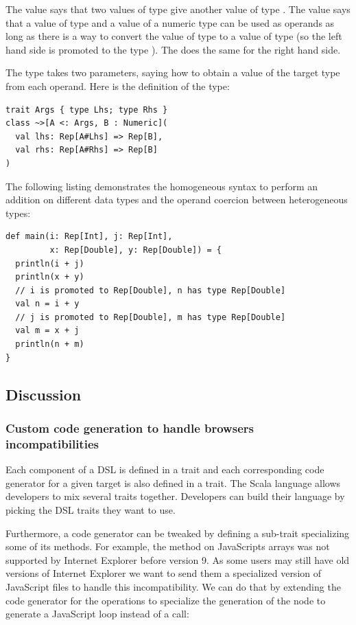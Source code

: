 \documentclass[american,english,runningheads]{llncs}
\begin{document}
The  value says that two values of type  give another value of type . The  value says that a value of type  and a value of a numeric type  can be used as operands as long as there is a way to convert the value of type  to a value of type  (so the left hand side is promoted to the type ). The  does the same for the right hand side.

The \code{\~\>} type takes two parameters, saying how to obtain a value of the target type from each operand. Here is the definition of the \code{\~\>} type:

\begin{lstlisting}
trait Args { type Lhs; type Rhs }
class ~>[A <: Args, B : Numeric](
  val lhs: Rep[A#Lhs] => Rep[B],
  val rhs: Rep[A#Rhs] => Rep[B]
)
\end{lstlisting}

The following listing demonstrates the homogeneous syntax to perform an addition on different data types and the operand coercion between heterogeneous types:

\begin{lstlisting}
def main(i: Rep[Int], j: Rep[Int],
         x: Rep[Double], y: Rep[Double]) = {
  println(i + j)
  println(x + y)
  // i is promoted to Rep[Double], n has type Rep[Double]
  val n = i + y
  // j is promoted to Rep[Double], m has type Rep[Double]
  val m = x + j
  println(n + m)
}
\end{lstlisting}

\subsection{Discussion}

\subsubsection{Custom code generation to handle browsers incompatibilities}

Each component of a DSL is defined in a trait and each corresponding code generator for a given target is also defined in a trait. The Scala language allows developers to mix several traits together. Developers can build their language by picking the DSL traits they want to use.

Furthermore, a code generator can be tweaked by defining a sub-trait specializing some of its methods. For example, the  method on JavaScripts arrays was not supported by Internet Explorer before version 9. As some users may still have old versions of Internet Explorer we want to send them a specialized version of JavaScript files to handle this incompatibility. We can do that by extending the code generator for the  operations to specialize the generation of the  node to generate a JavaScript  loop instead of a  call:
\end{document}
